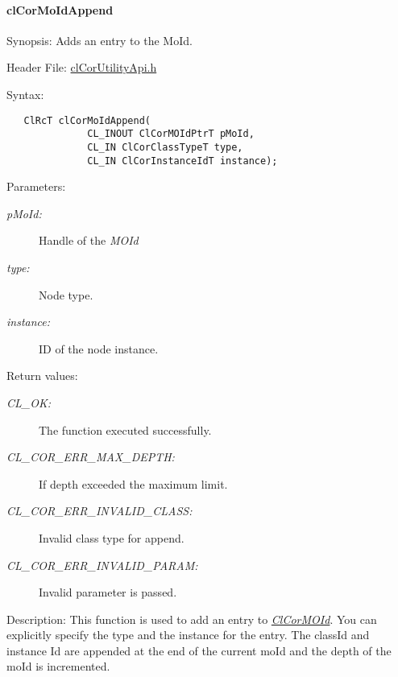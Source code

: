 \hypertarget{pagecor233}{}\paragraph{cl\-Cor\-Mo\-Id\-Append}\label{pagecor233}
\begin{Desc}
\item[Synopsis:]Adds an entry to the Mo\-Id.\end{Desc}
\begin{Desc}
\item[Header File:]\hyperlink{cl_cor_utility_api_8h}{cl\-Cor\-Utility\-Api.h}\end{Desc}
\begin{Desc}
\item[Syntax:]

\footnotesize\begin{verbatim}   ClRcT clCorMoIdAppend(
              CL_INOUT ClCorMOIdPtrT pMoId,
              CL_IN ClCorClassTypeT type,
              CL_IN ClCorInstanceIdT instance);
\end{verbatim}
\normalsize
\end{Desc}
\begin{Desc}
\item[Parameters:]
\begin{description}
\item[{\em p\-Mo\-Id:}]Handle of the {\em MOId\/} \item[{\em type:}]Node type. \item[{\em instance:}]ID of the node instance.\end{description}
\end{Desc}
\begin{Desc}
\item[Return values:]
\begin{description}
\item[{\em CL\_\-OK:}]The function executed successfully. \item[{\em CL\_\-COR\_\-ERR\_\-MAX\_\-DEPTH:}]If depth exceeded the maximum limit. \item[{\em CL\_\-COR\_\-ERR\_\-INVALID\_\-CLASS:}]Invalid class type for append. \item[{\em CL\_\-COR\_\-ERR\_\-INVALID\_\-PARAM:}]Invalid parameter is passed.\end{description}
\end{Desc}
\begin{Desc}
\item[Description:]This function is used to add an entry to {\em \hyperlink{struct_cl_cor_m_o_id}{Cl\-Cor\-MOId}\/}. You can explicitly specify the type and the instance for the entry. The class\-Id and instance Id are appended at the end of the current mo\-Id and the depth of the mo\-Id is incremented.\end{Desc}
